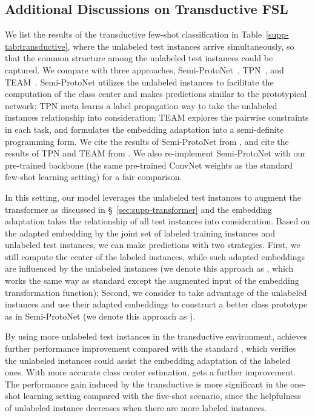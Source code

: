 \subsection{Additional Discussions on Transductive FSL}
\label{sec:supp-extended}
We list the results of the transductive few-shot classification in Table~\ref{supp-tab:transductive}, where the unlabeled test instances arrive simultaneously, so that the common structure among the unlabeled test instances could be captured.
We compare with three approaches, Semi-ProtoNet~\cite{Ren2018Meta}, TPN~\cite{Liu2018TPN}, and TEAM~\cite{Qiao2019Transductive}. Semi-ProtoNet utilizes the unlabeled instances to facilitate the computation of the class center and makes predictions similar to the prototypical network; TPN meta learns a label propagation way to take the unlabeled instances relationship into consideration; TEAM explores the pairwise constraints in each task, and formulates the embedding adaptation into a semi-definite programming form. We cite the results of Semi-ProtoNet from \cite{Ren2018Meta}, and cite the results of TPN and TEAM from \cite{Qiao2019Transductive}. We also re-implement  Semi-ProtoNet with our pre-trained backbone (the same pre-trained ConvNet weights as the standard few-shot learning setting) for a fair comparison.

In this setting, our model leverages the unlabeled test instances to augment the transformer as discussed in \S~\ref{sec:supp-transformer} and the embedding adaptation takes the relationship of all test instances into consideration. Based on the adapted embedding by the joint set of labeled training instances and unlabeled test instances, we can make predictions with two strategies. First, we still compute the center of the labeled instances, while such adapted embeddings are influenced by the unlabeled instances (we denote this approach as {\feat}, which works the same way as standard {\feat} except the augmented input of the embedding transformation function); Second, we consider to take advantage of the unlabeled instances and use their adapted embeddings to construct a better class prototype as in Semi-ProtoNet (we denote this approach as {\feat}).

By using more unlabeled test instances in the transductive environment, {\feat} achieves further performance improvement compared with the standard {\feat}, which verifies the unlabeled instances could assist the embedding adaptation of the labeled ones. With more accurate class center estimation, {\feat} gets a further improvement. The performance gain induced by the transductive \feat is more significant in the one-shot learning setting compared with the five-shot scenario, since the helpfulness of unlabeled instance decreases when there are more labeled instances.

